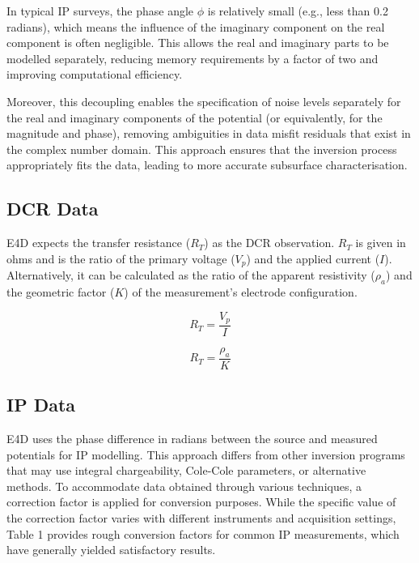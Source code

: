 \documentclass[a4paper,12pt]{article}
\begin{document}
In typical IP surveys, the phase angle \( \phi \) is relatively small (e.g., less than 0.2 radians), which means the influence of the imaginary component on the real component is often negligible. This allows the real and imaginary parts to be modelled separately, reducing memory requirements by a factor of two and improving computational efficiency.

Moreover, this decoupling enables the specification of noise levels separately for the real and imaginary components of the potential (or equivalently, for the magnitude and phase), removing ambiguities in data misfit residuals that exist in the complex number domain. This approach ensures that the inversion process appropriately fits the data, leading to more accurate subsurface characterisation.



\subsection{DCR Data}

E4D expects the transfer resistance ($R_T$) as the DCR observation. $R_T$ is given in ohms and is the ratio of the primary voltage ($V_p$) and the applied current ($I$). Alternatively, it can be calculated as the ratio of the apparent resistivity ($\rho_a$) and the geometric factor ($K$) of the measurement's electrode configuration.

\begin{equation}
R_T = \frac{V_p}{I}
\end{equation}

\begin{equation}
R_T = \frac{\rho_a}{K}
\end{equation}

\subsection{IP Data}

E4D uses the phase difference in radians between the source and measured potentials for IP modelling. This approach differs from other inversion programs that may use integral chargeability, Cole-Cole parameters, or alternative methods. To accommodate data obtained through various techniques, a correction factor is applied for conversion purposes. While the specific value of the correction factor varies with different instruments and acquisition settings, Table 1 provides rough conversion factors for common IP measurements, which have generally yielded satisfactory results.
\end{document}
